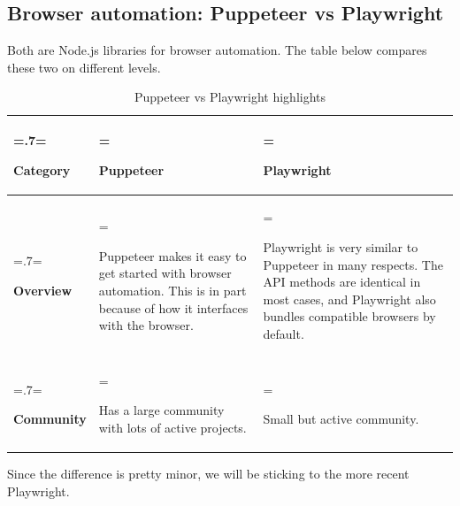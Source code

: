 \subsection{Browser automation: Puppeteer vs Playwright}
Both are Node.js libraries for browser automation. The table below compares these two on different levels.
\begin{table}[H]
    \renewcommand{\arraystretch}{1.5}%
    \caption{Puppeteer vs Playwright highlights}
    \centering
    \medskip
    \begin{tabularx}{1\textwidth} {
            | >{\hsize=.7\hsize\linewidth=\hsize\raggedright\arraybackslash}X
            | >{\hsize=1.15\hsize\linewidth=\hsize\raggedright\arraybackslash}X
            | >{\hsize=1.15\hsize\linewidth=\hsize\raggedright\arraybackslash}X |}
        \hline
        \rowcolor{primary} \textbf {Category} & \textbf {Puppeteer}                                                                                                            & \textbf {Playwright}                                                                                                                                               \\
        \hline
        \textbf {Overview}                    & Puppeteer makes it easy to get started with browser automation. This is in part because of how it interfaces with the browser. & Playwright is very similar to Puppeteer in many respects. The API methods are identical in most cases, and Playwright also bundles compatible browsers by default. \\
        \hline
        \textbf {Community}                   & Has a large community with lots of active projects.                                                                            & Small but active community.                                                                                                                                        \\
        \hline
    \end{tabularx}
\end{table}
Since the difference is pretty minor, we will be sticking to the more recent Playwright.

